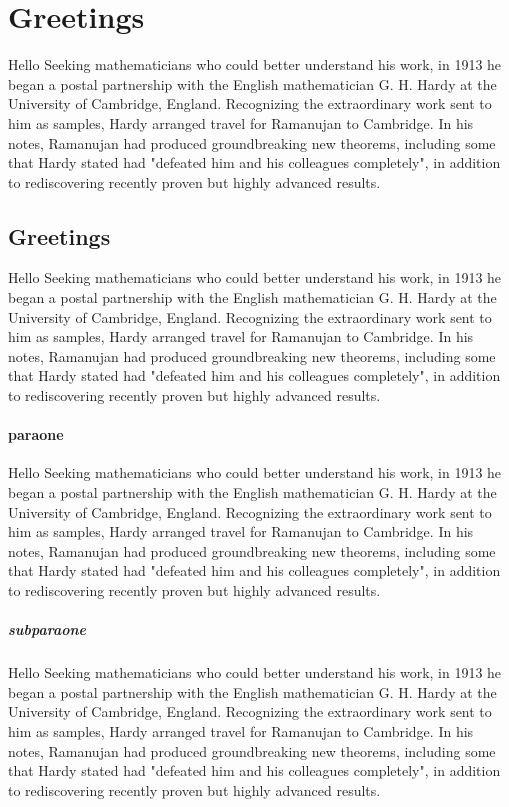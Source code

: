 \documentclass{article}
\begin{document}
\section{Greetings}
Hello Seeking mathematicians who could better understand his work, in 1913 he began a postal partnership with the English mathematician G. H. Hardy at the University of Cambridge, England. Recognizing the extraordinary work sent to him as samples, Hardy arranged travel for Ramanujan to Cambridge. In his notes, Ramanujan had produced groundbreaking new theorems, including some that Hardy stated had "defeated him and his colleagues completely", in addition to rediscovering recently proven but highly advanced results.

\subsection{Greetings}
Hello Seeking mathematicians who could better understand his work, in 1913 he began a postal partnership with the English mathematician G. H. Hardy at the University of Cambridge, England. Recognizing the extraordinary work sent to him as samples, Hardy arranged travel for Ramanujan to Cambridge. In his notes, Ramanujan had produced groundbreaking new theorems, including some that Hardy stated had "defeated him and his colleagues completely", in addition to rediscovering recently proven but highly advanced results.

\paragraph{paraone}
Hello Seeking mathematicians who could better understand his work, in 1913 he began a postal partnership with the English mathematician G. H. Hardy at the University of Cambridge, England. Recognizing the extraordinary work sent to him as samples, Hardy arranged travel for Ramanujan to Cambridge. In his notes, Ramanujan had produced groundbreaking new theorems, including some that Hardy stated had "defeated him and his colleagues completely", in addition to rediscovering recently proven but highly advanced results.

\subparagraph{subparaone}
Hello Seeking mathematicians who could better understand his work, in 1913 he began a postal partnership with the English mathematician G. H. Hardy at the University of Cambridge, England. Recognizing the extraordinary work sent to him as samples, Hardy arranged travel for Ramanujan to Cambridge. In his notes, Ramanujan had produced groundbreaking new theorems, including some that Hardy stated had "defeated him and his colleagues completely", in addition to rediscovering recently proven but highly advanced results.
\end{document}
